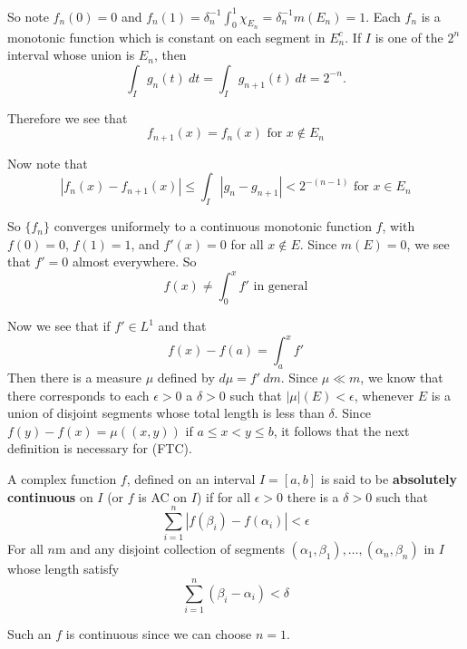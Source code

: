 \begin{enumerate}[label = (\alph*)]
        So note $f_n(0) = 0$ and $f_n(1) = \delta_n^{-1}\int_0^1 \chi_{E_n} = \delta_n^{-1}m(E_n) = 1$. Each $f_n$ is a monotonic function which is constant on each segment in $E_n^c$.
        If $I$ is one of the $2^n$ interval whose union is $E_n$, then\[
            \int_I g_n(t)~dt = \int_I g_{n+1}(t)~dt = 2^{-n}.    
        \]

        Therefore we see that \[
            f_{n+1}(x) = f_n(x)  \text{ for }x\not\in E_n   
        \]

        Now note that \[
            |f_n(x) - f_{n+1}(x)|\leq \int_I |g_n-g_{n+1}|<2^{-(n-1)} \text{ for } x\in E_n    
        \]

        So $\{f_n\}$ converges uniformely to a continuous monotonic function $f$, with $f(0) = 0$, $f(1) = 1$, and $f'(x) = 0$ for all $x\not\in E$. Since $m(E) = 0$, we see that $f' = 0$ almost everywhere. So\[
            f(x) \neq \int_0^x f' \text{ in general}    
        \]
    \end{enumerate}

    \begin{definition}\label{7.17}
            \begin{remark}
                Now we see that if $f'\in L^1$ and that \[
                    f(x) - f(a) = \int_a^x f'   \tag{FTC}
                \]
                Then there is a measure $\mu$ defined by $d\mu = f'~dm$. Since $\mu \ll m$, we know that there corresponds to each $\epsilon>0$ a $\delta>0$ such that $|\mu|(E)<\epsilon$, whenever $E$ is a union of disjoint segments whose total length is less than $\delta$. Since $f(y) - f(x) = \mu((x,y))$ if $a\leq x<y\leq b$, it follows that the next definition is necessary for (FTC). 
            \end{remark}
            A complex function $f$, defined on an interval $I = [a,b]$ is said to be \textbf{absolutely continuous} on $I$ (or $f$ is AC on $I$) if for all $\epsilon>0$ there is a $\delta>0$ such that\[
                \sum_{i=1}^n|f(\beta_i)-f(\alpha_i)|<\epsilon    
            \]
            For all $n$m and any disjoint collection of segments $(\alpha_1,\beta_1),\ldots,(\alpha_n,\beta_n)$ in $I$ whose length satisfy\[
                \sum_{i=1}^n (\beta_i-\alpha_i)<\delta    
            \]
            \begin{remark}
                Such an $f$ is continuous since we can choose $n=1$.
            \end{remark}
    \end{definition}

